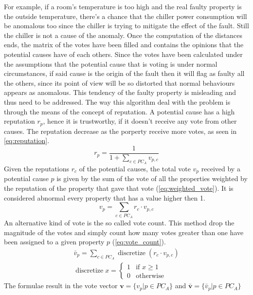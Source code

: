 For example, if a room's temperature is too high and the real faulty property is the outside temperature, there's a chance that the chiller power consumption will be anomalous too since the chiller is trying to mitigate the effect of the fault. Still the chiller is not a cause of the anomaly. Once the computation of the distances ends, the matrix of the votes have been filled and contains the opinions that the potential causes have of each others. Since the votes have been calculated under the assumptions that the potential cause that is voting is under normal circumstances, if said cause is the origin of the fault then it will flag as faulty all the others, since its point of view will be so distorted that normal behaviours appears as anomalous. This tendency of the faulty property is misleading and thus need to be addressed. The way this algorithm deal with the problem is through the means of the concept of reputation. A potential cause has a high reputation $r_p$, hence it is trustworthy, if it doesn't receive any vote from other causes. The reputation decrease as the porperty receive more votes, as seen in \autoref{eq:reputation}.
\begin{equation}
  \label{eq:reputation}
  r_p=\frac{1}{1+\sum\limits_{c\in PC_A}v_{p,c}}
\end{equation}
Given the reputations $r_{c}$ of the potential causes, the total vote $v_p$ received by a potential cause $p$ is given by the sum of the vote of all the properties weighted by the reputation of the property that gave that vote (\autoref{eq:weighted_vote}). It is considered abnormal every property that has a value higher then 1. %
\begin{equation}
  \label{eq:weighted_vote}
  v_p=\sum\limits_{c\in PC_A}r_c\cdot v_{p,c}
\end{equation}
An alternative kind of vote is the so called vote count. This method drop the magnitude of the votes and simply count how many votes greater than one have been assigned to a given property $p$ (\autoref{eq:vote_count}).
\begin{equation}
  \label{eq:vote_count}
  \begin{gathered}
  \bar v_p=\sum\limits_{c\in PC_A}\operatorname{discretize}{(r_c\cdot v_{p,c})}\\
  \operatorname{discretize}{x}=\begin{cases}
      1 & \text{if } x\geq 1\\
      0 & \text{otherwise}
    \end{cases}
  \end{gathered}
\end{equation}
The formulae result in the vote vector $\bm v=\{v_p|p\in PC_A\}$ and $\bm{\bar v}=\{\bar v_p|p\in PC_A\}$
